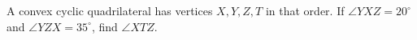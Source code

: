 A convex cyclic quadrilateral has vertices $X,Y,Z,T$ in that order. If $\angle YXZ=20^\circ$ and $\angle YZX=35^\circ$, find $\angle XTZ$.
